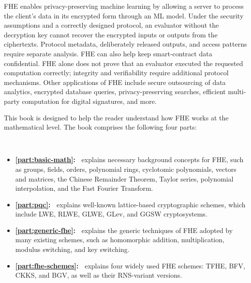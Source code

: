 \documentclass[11pt]{article}
\begin{document}
FHE enables privacy-preserving machine learning by allowing a server to process the client’s data in its encrypted form through an ML model. Under the security assumptions and a correctly designed protocol, an evaluator without the decryption key cannot recover the encrypted inputs or outputs from the ciphertexts. Protocol metadata, deliberately released outputs, and access patterns require separate analysis.
FHE can also help keep smart-contract data confidential. FHE alone does not prove that an evaluator executed the requested computation correctly; integrity and verifiability require additional protocol mechanisms.
Other applications of FHE include secure outsourcing of data analytics, encrypted database queries, privacy-preserving searches, efficient multi-party computation for digital signatures, and more.

This book is designed to help the reader understand how FHE works at the mathematical level. The book comprises the following four parts: 

$ $

\begin{itemize}
\item \textbf{\autoref{part:basic-math}:~} explains necessary background concepts for FHE, such as groups, fields, orders, polynomial rings, cyclotomic polynomials, vectors and matrices, the Chinese Remainder Theorem, Taylor series, polynomial interpolation, and the Fast Fourier Transform.

\item \textbf{\autoref{part:pqc}:~} explains well-known lattice-based cryptographic schemes, which include LWE, RLWE, GLWE, GLev, and GGSW cryptosystems.

\item \textbf{\textbf{\autoref{part:generic-fhe}:~}} explains the generic techniques of FHE adopted by many existing schemes, such as homomorphic addition, multiplication, modulus switching, and key switching. 


\item \textbf{\textbf{\autoref{part:fhe-schemes}:~}} explains four widely used FHE schemes: TFHE, BFV, CKKS, and BGV, as well as their RNS-variant versions.
\end{itemize}

$ $

\end{document}
